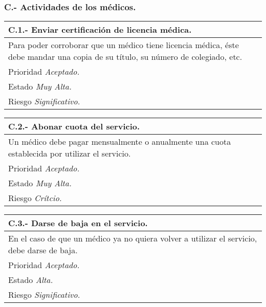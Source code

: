 	\subsubsection{C.- Actividades de los médicos.}

	\begin{center}
	\begin{tabulary}{15cm}{|L|}
		\hline
			\bf{C.1.- Enviar certificación de licencia médica.} \\
		\hline
			Para poder corroborar que un médico tiene licencia médica, éste debe mandar una copia de su título, su número de colegiado, etc. \\
		\hline
			Prioridad \textit{Aceptado.} \\
		\hline
			Estado \textit{Muy Alta.} \\
		\hline
			Riesgo \textit{Significativo.} \\
		\hline
	\end{tabulary}
	\end{center}

	\begin{center}
	\begin{tabulary}{15cm}{|L|}
		\hline
			\bf{C.2.- Abonar cuota del servicio.} \\
		\hline
			Un médico debe pagar mensualmente o anualmente una cuota establecida por utilizar el servicio. \\
		\hline
			Prioridad \textit{Aceptado.} \\
		\hline
			Estado \textit{Muy Alta.} \\
		\hline
			Riesgo \textit{Crítcio.} \\
		\hline
	\end{tabulary}
	\end{center}

	\begin{center}
	\begin{tabulary}{15cm}{|L|}
		\hline
			\bf{C.3.- Darse de baja en el servicio.} \\
		\hline
			En el caso de que un médico ya no quiera volver a utilizar el servicio, debe darse de baja. \\
		\hline
			Prioridad \textit{Aceptado.} \\
		\hline
			Estado \textit{Alta.} \\
		\hline
			Riesgo \textit{Significativo.} \\
		\hline
	\end{tabulary}
	\end{center}

